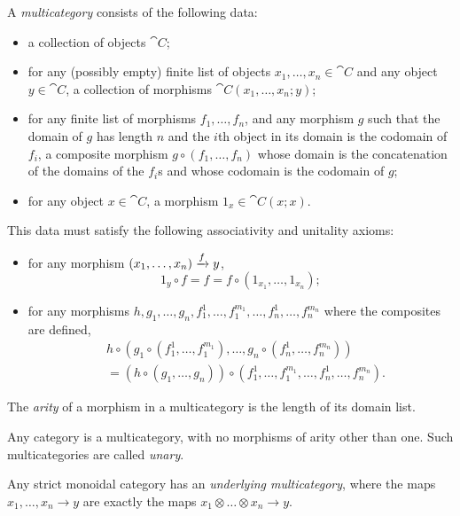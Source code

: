 \begin{dfn}[multicategory]\label{def:multicategory}
  A \emph{multicategory} consists of the following data:
  \begin{itemize}
    \item a collection of objects $\cat{C}$;
    \item for any (possibly empty) finite list of objects $x_1, \dots, x_n\in\cat{C}$ and any
      object $y\in\cat{C}$, a collection of morphisms $\cat{C}(x_1,\dots,x_n;y)$;
    \item for any finite list of morphisms $f_1,\dots,f_n$, and any morphism
      $g$ such that the domain of $g$ has length $n$ and the $i$th object in
      its domain is the codomain of $f_i$, a composite morphism
      $g\circ(f_1,\dots,f_n)$ whose domain is the concatenation of the domains
      of the $f_i$s and whose codomain is the codomain of $g$;
    \item for any object $x\in\cat{C}$, a morphism $1_x\in\cat{C}(x;x)$.
  \end{itemize}
  This data must satisfy the following associativity and unitality axioms:
  \begin{itemize}
    \item for any morphism $(x_1,\dots,x_n)\xrightarrow{f} y$, \[
        1_y\circ f = f = f\circ(1_{x_1},\dots,1_{x_n});
      \]
    \item for any morphisms
      $h,g_1,\dots,g_n,f_1^1,\dots,f_1^{m_1},\dots,f_n^1,\dots,f_n^{m_n}$ where
      the composites are defined,
      \begin{align*}
      &h\circ(g_1\circ(f_1^1,\dots,f_1^{m_1}),\dots,g_n\circ(f_n^1,\dots,f_n^{m_n})) \\
      &= (h\circ(g_1,\dots,g_n))\circ(f_1^1,\dots,f_1^{m_1},\dots,f_n^1,\dots,f_n^{m_n}).
      \end{align*}
  \end{itemize}
\end{dfn}

\begin{ntn}
  The \emph{arity} of a morphism in a multicategory is the length of its domain
  list.
\end{ntn}

\begin{ex}
  Any category is a multicategory, with no morphisms of arity other
  than one. Such multicategories are called \emph{unary}.
\end{ex}

\begin{ex}
  Any strict monoidal category has an \emph{underlying multicategory}, where the
  maps $x_1,\dots,x_n\to y$ are exactly the maps $x_1\otimes\dots\otimes x_n\to
  y$.
\end{ex}

